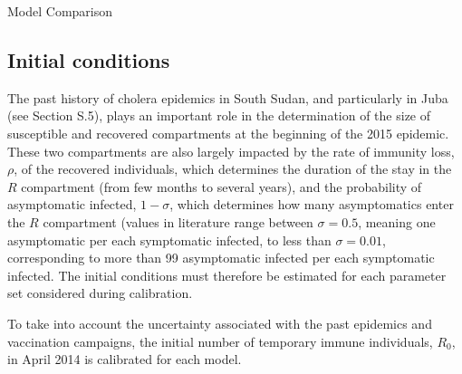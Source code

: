\begin{minipage}{\textwidth}
\begin{mybox}{Model Comparison}
\end{mybox}\end{minipage}\vspace{-7\baselineskip}
\vspace{7\baselineskip}

\subsection{Initial conditions}
 The past history of cholera epidemics in South Sudan, and particularly in Juba (see Section S.5), plays an important role in the determination of the size of susceptible and recovered compartments at the beginning of the 2015 epidemic. These two compartments are also largely impacted by the rate of immunity loss, $\rho$, of the recovered individuals, which determines the duration of the stay in the $R$ compartment (from few months to several years), and the probability of asymptomatic infected, $1-\sigma$, which determines how many asymptomatics enter the $R$ compartment (values in literature range between $\sigma=0.5$, meaning one asymptomatic per each symptomatic infected, to less than $\sigma=0.01$, corresponding to more than 99 asymptomatic infected per each symptomatic infected\cite{Fung:CholeraTransmissionDynamic:2014}. The initial conditions must therefore be estimated for each parameter set considered during calibration.
 
 To take into account the uncertainty associated with the past epidemics and vaccination campaigns, the initial number of temporary immune individuals, $R_0$, in April 2014 is calibrated for each model.
 
